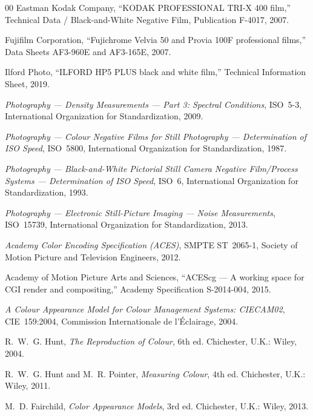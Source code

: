 \begin{thebibliography}{00}
Eastman Kodak Company, ``KODAK PROFESSIONAL TRI-X 400 film,'' Technical Data /
Black-and-White Negative Film, Publication F-4017, 2007.

Fujifilm Corporation, ``Fujichrome Velvia 50 and Provia 100F professional
films,'' Data Sheets AF3-960E and AF3-165E, 2007.

Ilford Photo, ``ILFORD HP5 PLUS black and white film,'' Technical Information
Sheet, 2019.

\emph{Photography --- Density Measurements --- Part 3: Spectral Conditions},
ISO~5-3, International Organization for Standardization, 2009.

\emph{Photography --- Colour Negative Films for Still Photography ---
Determination of ISO Speed}, ISO~5800, International Organization for
Standardization, 1987.

\emph{Photography --- Black-and-White Pictorial Still Camera Negative
Film/Process Systems --- Determination of ISO Speed}, ISO~6, International
Organization for Standardization, 1993.

\emph{Photography --- Electronic Still-Picture Imaging --- Noise Measurements},
ISO~15739, International Organization for Standardization, 2013.

\emph{Academy Color Encoding Specification (ACES)}, SMPTE ST~2065-1, Society of
Motion Picture and Television Engineers, 2012.

Academy of Motion Picture Arts and Sciences, ``ACEScg --- A working space for
CGI render and compositing,'' Academy Specification S-2014-004, 2015.

\emph{A Colour Appearance Model for Colour Management Systems: CIECAM02},
CIE~159:2004, Commission Internationale de l'\'Eclairage, 2004.

R.~W.~G. Hunt, \emph{The Reproduction of Colour}, 6th ed. Chichester, U.K.:
Wiley, 2004.

R.~W.~G. Hunt and M.~R. Pointer, \emph{Measuring Colour}, 4th ed. Chichester,
U.K.: Wiley, 2011.

M.~D. Fairchild, \emph{Color Appearance Models}, 3rd ed. Chichester, U.K.:
Wiley, 2013.


\end{thebibliography}
